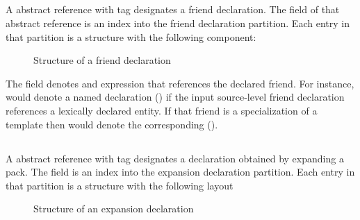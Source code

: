 \subsection{}
\label{sec:ifc:DeclSort:Friend}

A  abstract reference with tag  designates a friend declaration.
The  field of that abstract reference is an index into the friend declaration partition.
Each entry in that partition is a structure with the following component:
%
\begin{figure}[H]
	\centering
	\caption{Structure of a friend declaration}
	\label{fig:ifc:DeclSort:Friend}
\end{figure}
%

The  field denotes and expression that references the declared friend.  For instance, 
would denote a named declaration () if the input source-level friend declaration references
a lexically declared entity.  If that friend is a specialization of a template then  would denote 
the corresponding  ().



\subsection{}
\label{sec:ifc:DeclSort:Expansion}

A  abstract reference with tag  designates
a declaration obtained by expanding a pack.  The  field is an index
into the expansion declaration partition.  Each entry in that partition is a structure
with the following layout
%
\begin{figure}[H]
	\centering
	\caption{Structure of an expansion declaration}
	\label{fig:ifc-expansion-declaration-structure}
\end{figure}
%



\subsection{}
\label{sec:ifc:DeclSort:DeductionGuide}


